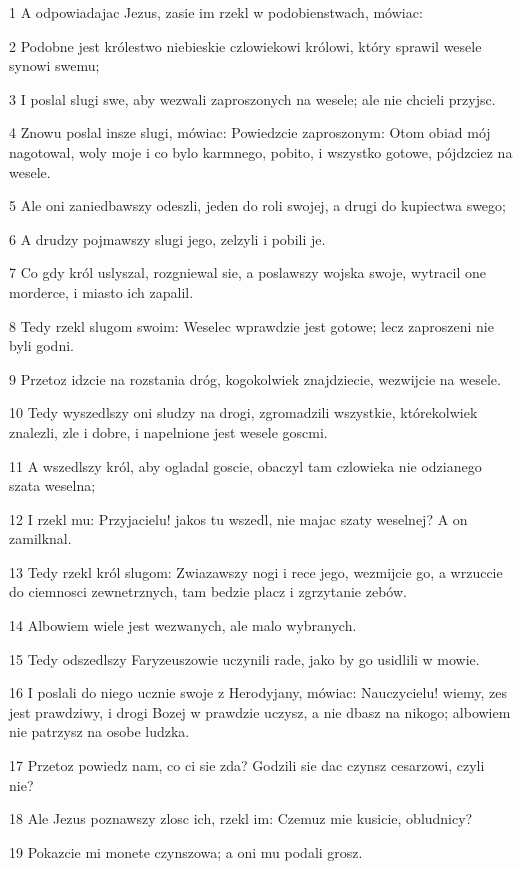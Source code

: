 \par 1 A odpowiadajac Jezus, zasie im rzekl w podobienstwach, mówiac:
\par 2 Podobne jest królestwo niebieskie czlowiekowi królowi, który sprawil wesele synowi swemu;
\par 3 I poslal slugi swe, aby wezwali zaproszonych na wesele; ale nie chcieli przyjsc.
\par 4 Znowu poslal insze slugi, mówiac: Powiedzcie zaproszonym: Otom obiad mój nagotowal, woly moje i co bylo karmnego, pobito, i wszystko gotowe, pójdzciez na wesele.
\par 5 Ale oni zaniedbawszy odeszli, jeden do roli swojej, a drugi do kupiectwa swego;
\par 6 A drudzy pojmawszy slugi jego, zelzyli i pobili je.
\par 7 Co gdy król uslyszal, rozgniewal sie, a poslawszy wojska swoje, wytracil one morderce, i miasto ich zapalil.
\par 8 Tedy rzekl slugom swoim: Weselec wprawdzie jest gotowe; lecz zaproszeni nie byli godni.
\par 9 Przetoz idzcie na rozstania dróg, kogokolwiek znajdziecie, wezwijcie na wesele.
\par 10 Tedy wyszedlszy oni sludzy na drogi, zgromadzili wszystkie, którekolwiek znalezli, zle i dobre, i napelnione jest wesele goscmi.
\par 11 A wszedlszy król, aby ogladal goscie, obaczyl tam czlowieka nie odzianego szata weselna;
\par 12 I rzekl mu: Przyjacielu! jakos tu wszedl, nie majac szaty weselnej? A on zamilknal.
\par 13 Tedy rzekl król slugom: Zwiazawszy nogi i rece jego, wezmijcie go, a wrzuccie do ciemnosci zewnetrznych, tam bedzie placz i zgrzytanie zebów.
\par 14 Albowiem wiele jest wezwanych, ale malo wybranych.
\par 15 Tedy odszedlszy Faryzeuszowie uczynili rade, jako by go usidlili w mowie.
\par 16 I poslali do niego ucznie swoje z Herodyjany, mówiac: Nauczycielu! wiemy, zes jest prawdziwy, i drogi Bozej w prawdzie uczysz, a nie dbasz na nikogo; albowiem nie patrzysz na osobe ludzka.
\par 17 Przetoz powiedz nam, co ci sie zda? Godzili sie dac czynsz cesarzowi, czyli nie?
\par 18 Ale Jezus poznawszy zlosc ich, rzekl im: Czemuz mie kusicie, obludnicy?
\par 19 Pokazcie mi monete czynszowa; a oni mu podali grosz.

